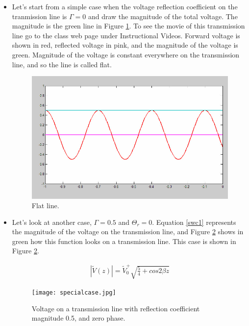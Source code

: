 \documentclass{ximera}
\begin{document}
\begin{itemize}
 \item Let's start 
from a simple case when the voltage reflection coefficient on the
tranmission line is $\Gamma=0$ and draw the magnitude of the total
voltage. The magnitude is the green line in Figure \ref{flatline}. To see the movie
of this transmission line go to the class web page under Instructional Videos. Forward voltage is shown in red, reflected voltage in pink,
and the magnitude of the voltage is  green. Magnitude of the voltage is constant everywhere on the transmission line, and so the line
is called flat.




\begin{figure}[htbp]
\begin{center}
\includegraphics[scale=0.3]{../jpg/flatline.jpg}
\end{center}
\caption{Flat line.}
\label{flatline}
\end{figure}



\item Let's look at another case,  $\Gamma=0.5$ and $\Theta_r=0$. Equation \ref{swc1}  represents the magnitude of the voltage on the transmission line, and Figure \ref{reflcoeffvid} shows in green how this function looks on a transmission line. This case is shown in Figure \ref{reflcoeffvid}. 

\begin{eqnarray}
|\tilde{V}(z)|=\tilde{V}_0^+ \sqrt{\frac{5}{4}+ cos{2 \beta z} }\label{swc1}
\end{eqnarray}

\begin{figure}[htbp]
\begin{center}
\texttt{[image: specialcase.jpg]}
\end{center}
\caption{Voltage on a transmission line with reflection coefficient magnitude 0.5, and zero phase.}
\label{reflcoeffvid}
\end{figure}




\end{itemize}
\end{document}
